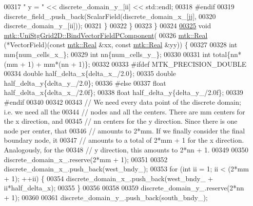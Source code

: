 \begin{DoxyCode}
00317         \textcolor{stringliteral}{" y = "} << discrete\_domain\_y\_[ii] << std::endl;
00318 \textcolor{preprocessor}{      #endif}
00319       discrete\_field\_.push\_back(ScalarField(discrete\_domain\_x\_[jj],
00320                                             discrete\_domain\_y\_[ii]));
00321     \}
00322   \}
00323 \}
00324 
\hypertarget{mtk__uni__stg__grid__2d_8cc_source_l00325}{}\hyperlink{classmtk_1_1UniStgGrid2D_a47b92d03ef5ed2b1ed28091a424f8f52}{00325} \textcolor{keywordtype}{void} \hyperlink{classmtk_1_1UniStgGrid2D_a47b92d03ef5ed2b1ed28091a424f8f52}{mtk::UniStgGrid2D::BindVectorFieldPComponent}(
00326   \hyperlink{group__c01-roots_gac080bbbf5cbb5502c9f00405f894857d}{mtk::Real} (*VectorField)(\textcolor{keyword}{const} \hyperlink{group__c01-roots_gac080bbbf5cbb5502c9f00405f894857d}{mtk::Real} &xx, \textcolor{keyword}{const} 
      \hyperlink{group__c01-roots_gac080bbbf5cbb5502c9f00405f894857d}{mtk::Real} &yy)) \{
00327 
00328   \textcolor{keywordtype}{int} mm\{num\_cells\_x\_\};
00329   \textcolor{keywordtype}{int} nn\{num\_cells\_y\_\};
00330 
00331   \textcolor{keywordtype}{int} total\{nn*(mm + 1) + mm*(nn + 1)\};
00332 
00333 \textcolor{preprocessor}{  #ifdef MTK\_PRECISION\_DOUBLE}
00334   \textcolor{keywordtype}{double} half\_delta\_x\{delta\_x\_/2.0\};
00335   \textcolor{keywordtype}{double} half\_delta\_y\{delta\_y\_/2.0\};
00336 \textcolor{preprocessor}{  #else}
00337   \textcolor{keywordtype}{float} half\_delta\_x\{delta\_x\_/2.0f\};
00338   \textcolor{keywordtype}{float} half\_delta\_y\{delta\_y\_/2.0f\};
00339 \textcolor{preprocessor}{  #endif}
00340 
00342 
00343   \textcolor{comment}{// We need every data point of the discrete domain; i.e. we need all the}
00344   \textcolor{comment}{// nodes and all the centers. There are mm centers for the x direction, and}
00345   \textcolor{comment}{// nn centers for the y direction. Since there is one node per center, that}
00346   \textcolor{comment}{// amounts to 2*mm. If we finally consider the final boundary node, it}
00347   \textcolor{comment}{// amounts to a total of 2*mm + 1 for the x direction. Analogously, for the}
00348   \textcolor{comment}{// y direction, this amounts to 2*nn + 1.}
00349 
00350   discrete\_domain\_x\_.reserve(2*mm + 1);
00351 
00352   discrete\_domain\_x\_.push\_back(west\_bndy\_);
00353   \textcolor{keywordflow}{for} (\textcolor{keywordtype}{int} ii = 1; ii < (2*mm + 1); ++ii) \{
00354     discrete\_domain\_x\_.push\_back(west\_bndy\_ + ii*half\_delta\_x);
00355   \}
00356 
00358 
00359   discrete\_domain\_y\_.reserve(2*nn + 1);
00360 
00361   discrete\_domain\_y\_.push\_back(south\_bndy\_);

\end{DoxyCode}
